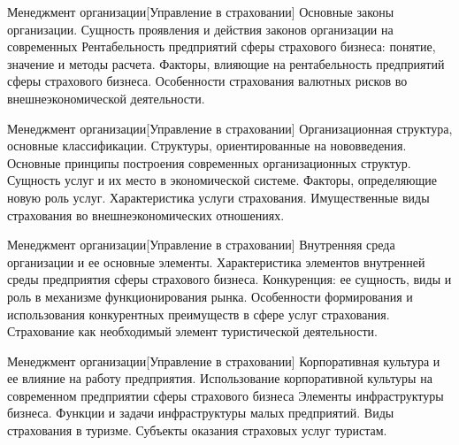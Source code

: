 \documentclass[
	11pt,
	a4paper,
	]
	{article}
\begin{document}
\vfill



\begin{minipage}[t][\miniH]{\miniL}\centering
	 {Менеджмент организации}[Управление в страховании]
		{
			Основные законы организации. Сущность проявления и действия законов организации на современных
		}{
			Рентабельность предприятий сферы страхового бизнеса: понятие, значение и методы расчета. Факторы, влияющие на рентабельность предприятий сферы страхового бизнеса.
		}{
			Особенности страхования валютных рисков во внешнеэкономической деятельности.
		}
	\lowGE
\end{minipage}

\vfill



\begin{minipage}[t][\miniH]{\miniL}\centering
	 {Менеджмент организации}[Управление в страховании]
		{
			Организационная структура, основные классификации. Структуры, ориентированные на нововведения. Основные принципы построения современных организационных структур.
		}{
			Сущность услуг и их место в экономической системе. Факторы, определяющие новую роль услуг. Характеристика услуги страхования.
		}{
			Имущественные виды страхования во внешнеэкономических отношениях.
		}
	\lowGE
\end{minipage}





\begin{minipage}[t][\miniH]{\miniL}\centering
	 {Менеджмент организации}[Управление в страховании]
		{
			Внутренняя среда организации и ее основные элементы. Характеристика элементов внутренней среды предприятия сферы страхового бизнеса.
		}{
			Конкуренция: ее сущность, виды и роль в механизме функционирования рынка. Особенности формирования и использования конкурентных преимуществ в сфере услуг страхования.
		}{
			Страхование как необходимый элемент туристической деятельности.
		}
	\lowGE
\end{minipage}

\vfill



\begin{minipage}[t][\miniH]{\miniL}\centering
	 {Менеджмент организации}[Управление в страховании]
		{
			Корпоративная культура и ее влияние на работу предприятия. Использование корпоративной культуры на современном предприятии сферы страхового бизнеса
		}{
			Элементы инфраструктуры бизнеса. Функции и задачи инфраструктуры малых предприятий.
		}{
			Виды страхования в туризме. Субъекты оказания страховых услуг туристам.
		}
	\lowGE
\end{minipage}
\end{document}
